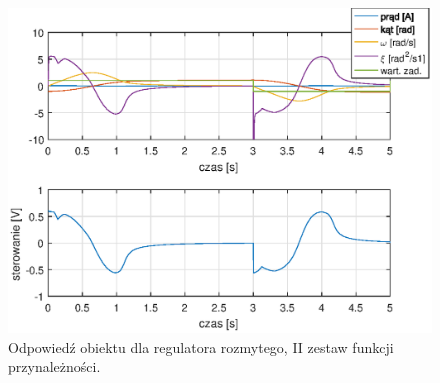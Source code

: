 \begin{figure}[h!]
	\centering
	\includegraphics[scale = 1]{fig/fuzzy_odp2.eps}
	\caption		
	{Odpowied\'z obiektu dla regulatora rozmytego, II zestaw funkcji przynależności.}
	\label{fuzzyOdp2}
\end{figure}

